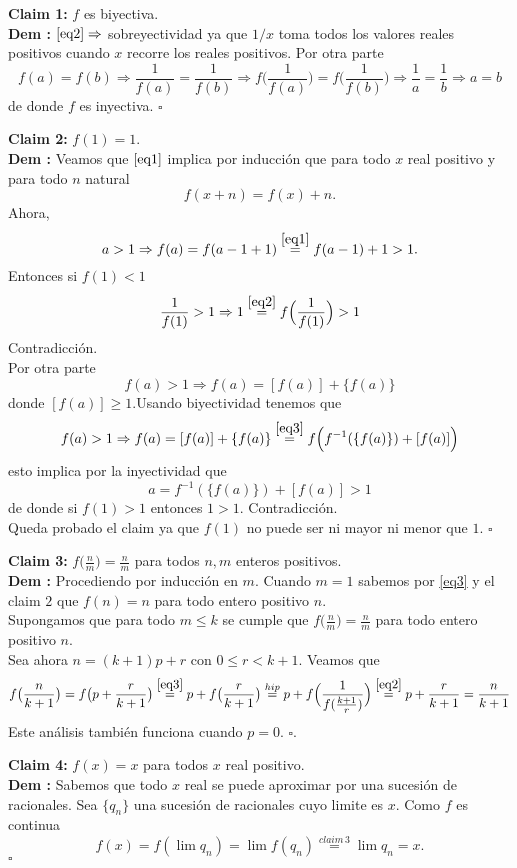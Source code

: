 \vspace{0.5cm}

\textbf{Claim 1:} $f$ es  biyectiva.\\
\textbf{Dem :} $\eqref{eq2}\Rightarrow$ sobreyectividad ya que $1/x$ toma todos los valores reales positivos cuando $x$ recorre los reales positivos.
Por otra parte 
\[
f(a) = f(b) \Rightarrow \frac{1}{f(a)} = \frac{1}{f(b)}\Rightarrow f\Big(\frac{1}{f(a)}\Big) = f\Big(\frac{1}{f(b)}\Big)\Rightarrow \frac{1}{a} = \frac{1}{b} \Rightarrow a=b
\]
de donde $f$ es inyectiva. $\square$

\vspace{0.5cm}

\textbf{Claim 2:} $f(1) = 1$.\\
\textbf{Dem :} Veamos que $\eqref{eq1}$ implica por inducción que para todo $x$ real positivo y para todo $n$ natural
\begin{equation}
\label{eq3}
f(x+n) = f(x)+n.
\end{equation}
Ahora,
\[
a>1\Rightarrow f(a) = f(a-1+1) \stackrel{\eqref{eq1}}{=}  f(a-1)+1 > 1.
\]
Entonces si $f(1)< 1$
\[
\frac{1}{f(1)} > 1 \Rightarrow 1 \stackrel{\eqref{eq2}}{=} f\Big(\frac{1}{f(1)}\Big) > 1 
\]
Contradicción.\\

Por otra parte 
\[
f(a) > 1\Rightarrow f(a) = [f(a)] + \{f(a)\}
\]
donde $[f(a)]\ge 1$.Usando biyectividad tenemos que 
\[
f(a) > 1\Rightarrow f(a) = [f(a)] + \{f(a)\} \stackrel{\eqref{eq3}}{=}f\Big( f^{-1}(\{f(a)\})+[f(a)]\Big)
\]
esto implica por la inyectividad que 
\[
a = f^{-1}(\{f(a)\})+[f(a)] > 1
\]
de donde si $f(1)>1$ entonces $1>1$. Contradicción.\\
Queda probado el claim ya que $f(1)$ no puede ser ni mayor ni menor que $1$. $\square$

\vspace{0.5cm}

\textbf{Claim 3:} $f\big(\frac{n}{m}\big) = \frac{n}{m}$ para todos $n,m$ enteros positivos.\\
\textbf{Dem :} Procediendo por inducción en $m$. Cuando $m=1$ sabemos por \eqref{eq3} y el claim $2$ que $f(n) = n$ para todo entero positivo $n$.\\
Supongamos que para todo $m \le k$ se cumple que $f\big(\frac{n}{m}\big) = \frac{n}{m}$ para todo entero positivo $n$.\\
Sea ahora $n = (k+1)p+r$ con $0\le r < k+1$. Veamos que
\[
f\big(\frac{n}{k+1}\big) = f\big(p + \frac{r}{k+1}\big) \stackrel{\eqref{eq3}}{=} p+f\big(\frac{r}{k+1}\big) \stackrel{hip}{=} p+ f\Big(\frac{1}{f(\frac{k+1}{r})}\Big)  \stackrel{\eqref{eq2}}{=} p + \frac{r}{k+1} = \frac{n}{k+1}
\]
Este análisis también funciona cuando $p = 0$. $\square$.

\vspace{0.5cm}
\textbf{Claim 4:} $f(x)= x$ para todos $x$ real positivo.\\
\textbf{Dem :} Sabemos que todo $x$ real se puede aproximar por una sucesión de racionales. Sea $\{q_n\}$ una sucesión de racionales cuyo limite es $x$. Como $f$ es continua
\[
f(x) = f(\lim q_n) = \lim f(q_n)\stackrel{claim\,3}{=} \lim q_n = x.
\]
$\square$



